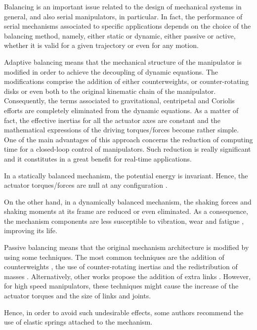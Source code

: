 \documentclass[a4paper,11pt,brazil,fleqn]{article}
\begin{document}
Balancing is an important issue related to the design of mechanical systems in general, and also serial manipulators, in particular. In fact, the performance of serial mechanisms associated to specific applications depends on the choice of the balancing method, namely, either static or dynamic, either passive or active, whether it is valid for a given trajectory or even for any motion.

Adaptive balancing means that the mechanical structure of the manipulator is modified in order to achieve the decoupling of dynamic equations. The modifications comprise the addition of either counterweights, or counter-rotating disks or even both to the original kinematic chain of the manipulator. Consequently, the terms associated to gravitational, centripetal and Coriolis efforts are completely eliminated from the dynamic equations. As a matter of fact, the effective inertias for all the actuator axes are constant and the mathematical expressions of the driving torques/forces become rather simple. One of the main advantages of this approach concerns the reduction of computing time for a closed-loop control of manipulators. Such reduction is really significant and it constitutes in a great benefit for real-time applications.

In a statically balanced mechanism, the potential energy is invariant. Hence,
the actuator torques/forces are null at any configuration \cite{6wang}.

On the other hand, in a dynamically balanced mechanism, the shaking forces and
shaking moments at its frame are reduced or even eliminated. As a consequence, 
the mechanism components are less susceptible to vibration, wear and fatigue \cite{4wu}, improving its life.

Passive balancing means that the original mechanism architecture is modified by using some techniques. The most common techniques are
the addition of counterweights \cite{1wijk,2arakelian,3seo,4wu,6wang,7wang,12russo,15coelho,16moradi}, 
the use of counter-rotating inertias \cite{2arakelian,4wu,15coelho,16moradi} 
and the redistribution of masses \cite{8alici,9alici}. Alternatively, other works propose the addition of extra links \cite{5gosselin,12russo,13agrawal}.
However, for high speed manipulators, these techniques might cause the increase of the actuator torques and the size of links and joints.

Hence, in order to avoid such undesirable effects, some 
authors \cite{6wang,7wang,8alici,9alici,10dehkordi,13agrawal} recommend the use of  elastic springs attached to the mechanism.
\end{document}
